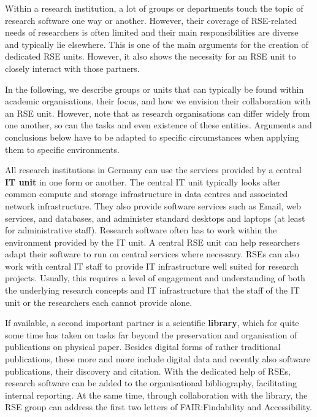 \documentclass[a4paper]{article}
\begin{document}
Within a research institution, a lot of groups or departments touch the topic of research software one way or another.
However, their coverage of RSE-related needs of researchers is often limited and their main responsibilities are diverse and typically lie elsewhere.
This is one of the main arguments for the creation of dedicated RSE units.
However, it also shows the necessity for an RSE unit to closely interact with those partners.

In the following, we describe groups or units that can typically be found within academic organisations, their focus, and how we envision their collaboration with an RSE unit.
However, note that as research organisations can differ widely from one another, so can the tasks and even existence of these entities.
Arguments and conclusions below have to be adapted to specific circumstances when applying them to specific environments.

All research institutions in Germany can use the services provided by a central \textbf{IT unit} in one form or another.
The central IT unit typically looks after common compute and storage infrastructure in data centres and associated network infrastructure.
They also provide software services such as Email, web services, and databases, and administer standard desktops and laptops (at least for administrative staff).
Research software often has to work within the environment provided by the IT unit.
A central RSE unit can help researchers adapt their software to run on central services where necessary.
RSEs can also work with central IT staff to provide IT infrastructure well suited for research projects.
Usually, this requires a level of engagement and understanding of both the underlying research concepts and IT infrastructure that the staff of the IT unit or the researchers each cannot provide alone.

If available, a second important partner is a scientific \textbf{library}, which for quite some time has taken on tasks far beyond the preservation and organisation of publications on physical paper.
Besides digital forms of rather traditional publications, these more and more include digital data and recently also software publications, their discovery and citation.
With the dedicated help of RSEs, research software can be added to the organisational bibliography, facilitating internal reporting.
At the same time, through collaboration with the library, the RSE group can address the first two letters of FAIR:\@ Findability and Accessibility.
\end{document}
